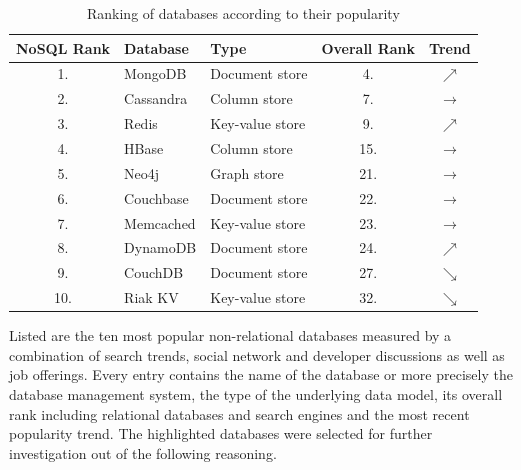 \begin{table}[h]
 \sffamily 
 \centering
 \begin{tabular}{cllcc}
  \textbf{NoSQL Rank} & \textbf{Database} & \textbf{Type} & \textbf{Overall Rank} & \textbf{Trend} \\ \hline
  \rowcolor{light-gray} 1. &  MongoDB     & Document store & 4. & $\scriptstyle\nearrow$ \\
  2. &  Cassandra   & Column store & 7. & $\rightarrow$ \\
  \rowcolor{light-gray} 3. &  Redis       & Key-value store & 9. & $\scriptstyle\nearrow$ \\
  4. &  HBase       & Column store & 15. & $\rightarrow$ \\
  5. &  Neo4j       & Graph store & 21. & $\rightarrow$ \\
  6. &  Couchbase  & Document store & 22. & $\rightarrow$ \\
  \rowcolor{light-gray} 7. &  Memcached & Key-value store & 23. & $\rightarrow$ \\
  8. &  DynamoDB & Document store & 24. & $\scriptstyle\nearrow$ \\
  \rowcolor{light-gray} 9. &  CouchDB   & Document store & 27. & $\scriptstyle\searrow$ \\
  10. &  Riak KV & Key-value store & 32. & $\scriptstyle\searrow$ \\
  \bottomrule
 \end{tabular}
 \caption{Ranking of databases according to their popularity}
 \label{tab:db_ranking}
\end{table}

Listed are the ten most popular non-relational databases measured by a combination of search trends, social network and developer discussions as well as job offerings. Every entry contains the name of the database or more precisely the database management system, the type of the underlying data model, its overall rank including relational databases and search engines and the most recent popularity trend. The highlighted databases were selected for further investigation out of the following reasoning.

